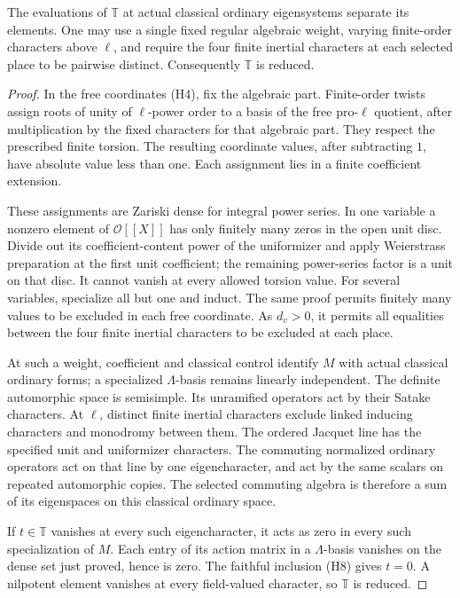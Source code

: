 \begin{srlemma}\label{lem:sr-unitary-classical-separation}
The evaluations of \(\mathbb T\) at actual classical ordinary
eigensystems separate its elements.
One may use a single fixed regular algebraic weight,
varying finite-order characters above \(\ell\), and require
the four finite inertial characters at each selected
place to be pairwise distinct.
Consequently \(\mathbb T\) is reduced.
\end{srlemma}
\begin{proof}
In the free coordinates (H4), fix the algebraic part.
Finite-order twists assign roots of unity of \(\ell\)-power
order to a basis of the free pro-\(\ell\) quotient,
after multiplication by the fixed characters for that
algebraic part.
They respect the prescribed finite torsion.
The resulting coordinate values, after subtracting \(1\),
have absolute value less than one.
Each assignment lies in a finite coefficient extension.

These assignments are Zariski dense for integral power series.
In one variable a nonzero element of \(\mathcal O[[X]]\)
has only finitely many zeros in the open unit disc.
Divide out its coefficient-content power of the uniformizer
and apply Weierstrass preparation at the first unit coefficient;
the remaining power-series factor is a unit on that disc.
It cannot vanish at every allowed torsion value.
For several variables, specialize all but one and induct.
The same proof permits finitely many values to be excluded
in each free coordinate.
As \(d_v>0\), it permits all equalities between the four
finite inertial characters to be excluded at each place.

At such a weight, coefficient and classical control identify
\(M\) with actual classical ordinary forms; a specialized
\(\Lambda\)-basis remains linearly independent.
The definite automorphic space is semisimple.
Its unramified operators act by their Satake characters.
At \(\ell\), distinct finite inertial characters exclude
linked inducing characters and monodromy between them.
The ordered Jacquet line has the specified unit and
uniformizer characters.
The commuting normalized ordinary operators act on that
line by one eigencharacter, and act by the same scalars
on repeated automorphic copies.
The selected commuting algebra is therefore a sum of its
eigenspaces on this classical ordinary space.

If \(t\in\mathbb T\) vanishes at every such eigencharacter,
it acts as zero in every such specialization of \(M\).
Each entry of its action matrix in a \(\Lambda\)-basis
vanishes on the dense set just proved, hence is zero.
The faithful inclusion (H8) gives \(t=0\).
A nilpotent element vanishes at every field-valued character,
so \(\mathbb T\) is reduced.
\end{proof}

